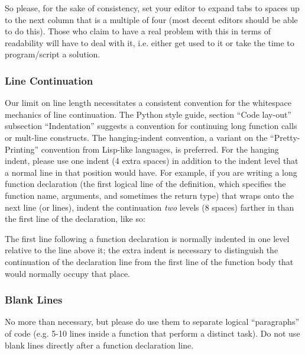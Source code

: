 \documentclass[12pt]{article}
\begin{document}
So please, for the sake of consistency, set your editor to expand tabs to spaces up to the next column that is a multiple of four (most decent editors should be able to do this). Those who claim to have a real problem with this in terms of readability will have to deal with it, i.e. either get used to it or take the time to program/script a solution.

\subsubsection{Line Continuation}
Our limit on line length necessitates a consistent convention for the whitespace mechanics of line continuation. The Python style guide, section ``Code lay-out'' subsection ``Indentation'' suggests a convention for continuing long function calls or mult-line constructs. The hanging-indent convention, a variant on the ``Pretty-Printing'' convention from Lisp-like languages, is preferred. For the hanging indent, please use one indent (4 extra spaces) in addition to the indent level that a normal line in that position would have. For example, if you are writing a long function declaration (the first logical line of the definition, which specifies the function name, arguments, and sometimes the return type) that wraps onto the next line (or lines), indent the continuation \emph{two} levels (8 spaces) farther in than the first line of the declaration, like so:
\begin{codeex}
// Function declaration
VisionInterface:: VisionInterface(
        Matx33f cameraMat, Mat distCoeffs, Matx33f perspTrans,
        std::string camAddress) :
        cameraMat(cameraMat), distCoeffs(distCoeffs), perspTrans(perspTrans) {
    // Start of function body
    if (!source.open(camAddress)) {
    ...
\end{codeex}
The first line following a function declaration is normally indented in one level relative to the line above it; the extra indent is necessary to distinguish the continuation of the declaration line from the first line of the function body that would normally occupy that place.

\subsubsection{Blank Lines}
No more than necessary, but please do use them to separate logical ``paragraphs'' of code (e.g. 5-10 lines inside a function that perform a distinct task). Do not use blank lines directly after a function declaration line.
\end{document}
